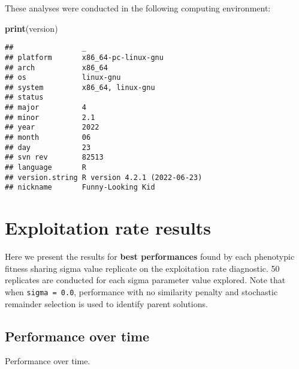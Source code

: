 \documentclass[]{book}
\newenvironment{Shaded}{\begin{snugshade}}{\end{snugshade}}
\newcommand{\DataTypeTok}[1]{\textcolor[rgb]{0.13,0.29,0.53}{#1}}
\newcommand{\KeywordTok}[1]{\textcolor[rgb]{0.13,0.29,0.53}{\textbf{#1}}}
\newcommand{\NormalTok}[1]{#1}
\newcommand{\OperatorTok}[1]{\textcolor[rgb]{0.81,0.36,0.00}{\textbf{#1}}}
\newcommand{\StringTok}[1]{\textcolor[rgb]{0.31,0.60,0.02}{#1}}
\begin{document}
These analyses were conducted in the following computing environment:

\begin{Shaded}
\begin{Highlighting}[]
\KeywordTok{print}\NormalTok{(version)}
\end{Highlighting}
\end{Shaded}

\begin{verbatim}
##                _                           
## platform       x86_64-pc-linux-gnu         
## arch           x86_64                      
## os             linux-gnu                   
## system         x86_64, linux-gnu           
## status                                     
## major          4                           
## minor          2.1                         
## year           2022                        
## month          06                          
## day            23                          
## svn rev        82513                       
## language       R                           
## version.string R version 4.2.1 (2022-06-23)
## nickname       Funny-Looking Kid
\end{verbatim}

\hypertarget{exploitation-rate-results-4}{%
\section{Exploitation rate results}\label{exploitation-rate-results-4}}

Here we present the results for \textbf{best performances} found by each phenotypic fitness sharing sigma value replicate on the exploitation rate diagnostic.
50 replicates are conducted for each sigma parameter value explored.
Note that when \texttt{sigma\ =\ 0.0}, performance with no similarity penalty and stochastic remainder selection is used to identify parent solutions.

\hypertarget{performance-over-time-11}{%
\subsection{Performance over time}\label{performance-over-time-11}}

Performance over time.

\begin{Shaded}
\end{Shaded}
\end{document}
